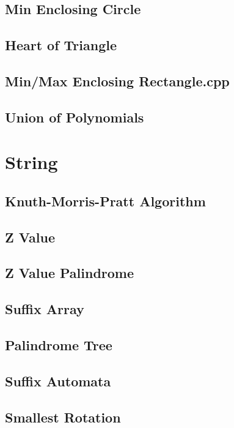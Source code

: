 \documentclass[a4paper,10pt,twocolumn,oneside]{article}
\begin{document}
\subsection{Min Enclosing Circle}

\subsection{Heart of Triangle}

\subsection{Min/Max Enclosing Rectangle.cpp}

\subsection{Union of Polynomials}


\section{String}
\subsection{Knuth-Morris-Pratt Algorithm}

\subsection{Z Value}

\subsection{Z Value Palindrome}

\subsection{Suffix Array}

\subsection{Palindrome Tree}

\subsection{Suffix Automata}

\subsection{Smallest Rotation}

\end{document}
